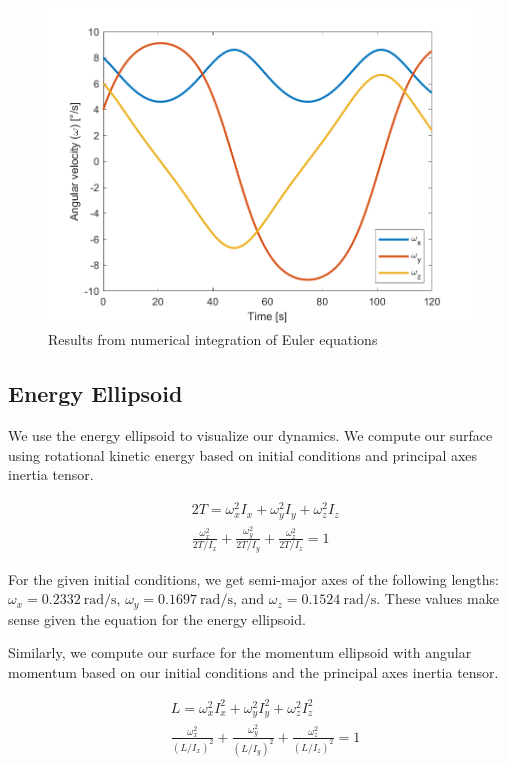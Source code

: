 \begin{figure}[H]
\centering
\includegraphics[scale=0.6]{Images/ps2_euler_equations.png}
\caption{Results from numerical integration of Euler equations}
\label{fig:ps2_euler_equations}
\end{figure}

\subsection{Energy Ellipsoid}
We use the energy ellipsoid to visualize our dynamics. We compute our surface using rotational kinetic energy based on initial conditions and principal axes inertia tensor.

\begin{align*}
    &2T = \omega_{x}^{2} I_{x} + \omega_{y}^{2} I_{y} + \omega_{z}^{2} I_{z} \\
    &\frac{\omega_{x}^{2}}{2T/I_{x}} + \frac{\omega_{y}^{2}}{2T/I_{y}} + \frac{\omega_{z}^{2}}{2T/I_{z}} = 1
\end{align*}

For the given initial conditions, we get semi-major axes of the following lengths: $\omega_{x} = \qty{0.2332}{\radian\per\second}$, $\omega_{y} = \qty{0.1697}{\radian\per\second}$, and $\omega_{z} = \qty{0.1524}{\radian\per\second}$. These values make sense given the equation for the energy ellipsoid.

Similarly, we compute our surface for the momentum ellipsoid with angular momentum based on our initial conditions and the principal axes inertia tensor.

\begin{align*}
    &L = \omega_{x}^{2} I_{x}^{2} + \omega_{y}^{2} I_{y}^{2} + \omega_{z}^{2} I_{z}^{2} \\
    &\frac{\omega_{x}^{2}}{(L/I_{x})^{2}} + \frac{\omega_{y}^{2}}{(L/I_{y})^{2}} + \frac{\omega_{z}^{2}}{(L/I_{z})^{2}} = 1
\end{align*}


